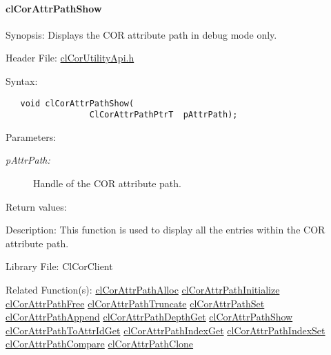 \hypertarget{pagecor262}{}\paragraph{cl\-Cor\-Attr\-Path\-Show}\label{pagecor262}
\begin{Desc}
\item[Synopsis:]Displays the COR attribute path in debug mode only.\end{Desc}
\begin{Desc}
\item[Header File:]\hyperlink{cl_cor_utility_api_8h}{cl\-Cor\-Utility\-Api.h}\end{Desc}
\begin{Desc}
\item[Syntax:]

\footnotesize\begin{verbatim}   void clCorAttrPathShow(
                 ClCorAttrPathPtrT  pAttrPath);
\end{verbatim}
\normalsize
\end{Desc}
\begin{Desc}
\item[Parameters:]
\begin{description}
\item[{\em p\-Attr\-Path:}]Handle of the COR attribute path.\end{description}
\end{Desc}
\begin{Desc}
\item[Return values:]\end{Desc}
\begin{Desc}
\item[Description:]This function is used to display all the entries within the COR attribute path.\end{Desc}
\begin{Desc}
\item[Library File:]Cl\-Cor\-Client\end{Desc}
\begin{Desc}
\item[Related Function(s):]\hyperlink{group__group13}{cl\-Cor\-Attr\-Path\-Alloc} \hyperlink{group__group13}{cl\-Cor\-Attr\-Path\-Initialize} \hyperlink{group__group13}{cl\-Cor\-Attr\-Path\-Free} \hyperlink{group__group13}{cl\-Cor\-Attr\-Path\-Truncate} \hyperlink{group__group13}{cl\-Cor\-Attr\-Path\-Set} \hyperlink{group__group13}{cl\-Cor\-Attr\-Path\-Append} \hyperlink{group__group13}{cl\-Cor\-Attr\-Path\-Depth\-Get} \hyperlink{group__group13}{cl\-Cor\-Attr\-Path\-Show} \hyperlink{group__group13}{cl\-Cor\-Attr\-Path\-To\-Attr\-Id\-Get} \hyperlink{group__group13}{cl\-Cor\-Attr\-Path\-Index\-Get} \hyperlink{group__group13}{cl\-Cor\-Attr\-Path\-Index\-Set} \hyperlink{group__group13}{cl\-Cor\-Attr\-Path\-Compare} \hyperlink{group__group13}{cl\-Cor\-Attr\-Path\-Clone} \end{Desc}
